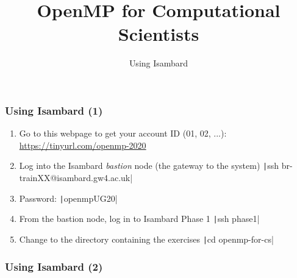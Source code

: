 \documentclass[aspectratio=169]{beamer}
\title{OpenMP for Computational Scientists}
\subtitle{Using Isambard}
\begin{document}
\frame{\titlepage}


\begin{frame}
\frametitle{Using Isambard (1)}
\begin{enumerate}
\item Go to this webpage to get your account ID (01, 02, ...): \url{https://tinyurl.com/openmp-2020}
\item Log into the Isambard \emph{bastion} node (the gateway to the system)\newline
\texttt|ssh br-trainXX@isambard.gw4.ac.uk|
\item Password: \texttt|openmpUG20|
\item From the bastion node, log in to Isambard Phase 1\newline
\texttt|ssh phase1|
\item Change to the directory containing the exercises\newline
\texttt|cd openmp-for-cs|
\end{enumerate}

\end{frame}

\begin{frame}
\frametitle{Using Isambard (2)}

\end{frame}
\end{document}
